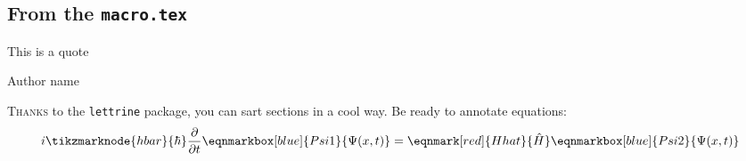 \subsection{From the \texttt{macro.tex}}
\epigraph{This is a quote}{Author name}
\lettrine[lines=2]{\color{BrickRed}T}{hanks} to the \texttt{lettrine} package, you can sart sections in a cool way. 
Be ready to annotate equations:
\vspace{4em}
\begin{equation*}
i \tikzmarknode{hbar}{\mathstrut\hbar} \frac{\partial}{\partial t}
\eqnmarkbox[blue]{Psi1}{\Psi(x, t)} = \eqnmark[red]{Hhat}{\hat{H}}
\eqnmarkbox[blue]{Psi2}{\Psi(x, t)}
\end{equation*}
\vspace{1em}
